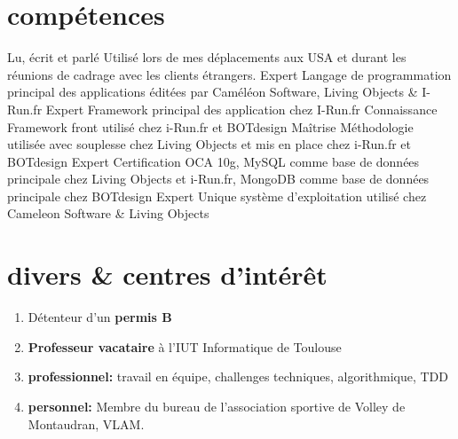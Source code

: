 \documentclass{friggeri-cv} 	%
\begin{document}
\section{compétences}
\vspace{-0.4cm}
\begin{capabilitize}
		{Lu, écrit et parlé}
		{Utilisé lors de mes déplacements aux USA et durant les réunions de cadrage avec les clients
		étrangers.}
		{Expert}
		{Langage de programmation principal des applications éditées par Caméléon Software, Living Objects \& I-Run.fr}
		{Expert}
		{Framework principal des application chez I-Run.fr}
		{Connaissance}
		{Framework front utilisé chez i-Run.fr et BOTdesign}
		{Maîtrise}
		{Méthodologie utilisée avec souplesse chez Living Objects et mis en place chez i-Run.fr et BOTdesign}
		{Expert}
		{Certification OCA 10g, MySQL comme base de données principale chez Living Objects et i-Run.fr, MongoDB comme base de données principale chez BOTdesign}
		{Expert}
		{Unique système d’exploitation utilisé chez Cameleon Software \& Living Objects}
\end{capabilitize}


\section{divers \& centres d’intérêt}
\vspace{-0.4cm}
\begin{enumerate}
    \item Détenteur d’un \textbf{permis B}
    \item \textbf{Professeur vacataire} à l’IUT Informatique de Toulouse
    \item \textbf{professionnel:} travail en équipe, challenges techniques, algorithmique, TDD
    \item \textbf{personnel:} Membre du bureau de l’association sportive de Volley de Montaudran, VLAM.
\end{enumerate}
\end{document}

